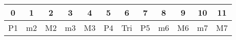 \documentclass{standalone}
\begin{document}
     \begin{tabular}{||c|c|c|c|c|c|c|c|c|c|c|c||} 
     \hline
      0 & 1 & 2 & 3 & 4 & 5 & 6 & 7 & 8 & 9 & 10 & 11  \\
     \hline \hline 
      P1 & m2 & M2 & m3 & M3 & P4 & Tri & P5 & m6 & M6 & m7 & M7 \\
     \hline 
  \end{tabular}
\end{document}
